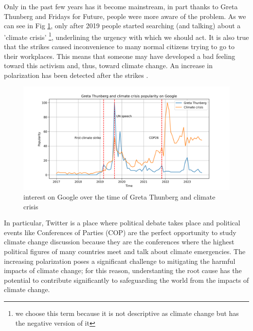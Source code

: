 Only in the past few years has it become mainstream, in part thanks to Greta Thunberg \cite{sabherwal_greta_2021} and Fridays for Future, people were more aware of the problem. As we can see in Fig \ref{fig:google_greta}, only after 2019 people started searching (and talking) about a 'climate crisis' \footnote{we choose this term because it is not descriptive as climate change but has the negative version of it}, underlining the urgency with which we should act. It is also true that the strikes caused inconvenience to many normal citizens trying to go to their workplaces. This means that someone may have developed a bad feeling toward this activism and, thus, toward climate change. An increase in polarization has been detected after the strikes \cite{Falkenberg_climate_2022}.
\\


\begin{figure}
    \centering
    \includegraphics[width=0.85\linewidth]{Chapter1/figures/greta_climate_crisis.png}
    \caption{interest on Google over the time of Greta Thunberg and climate crisis}
    \label{fig:google_greta}
\end{figure}
In particular, Twitter is a place where political debate takes place \cite{Pew_twitter_2022} and political events like 
Conferences of Parties (COP) are the perfect opportunity to study climate change discussion because they are the conferences where the highest political figures of many countries meet and talk about climate emergencies. The increasing polarization poses a significant challenge to mitigating the harmful impacts of climate change; for this reason, understanting the root cause has the potential to contribute significantly to safeguarding the world from the impacts of climate change.



